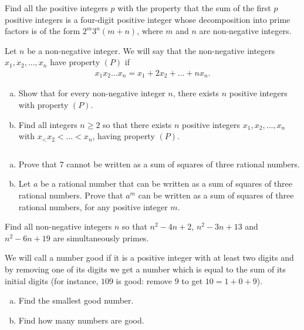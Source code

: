 \documentclass[problems.tex]{subfile}
\begin{document}
	\begin{problem}
		Find all the positive integers $p$ with the property that the sum of the first $p$ positive integers is a four-digit positive integer whose decomposition into prime factors is of the form $2^m3^n(m + n)$, where $m$ and $n$ are non-negative integers.
	\end{problem}



	\begin{problem}
		Let $n$ be a non-negative integer. We will say that the non-negative integers $x_1, x_2, \dots, x_n$ have property $(P)$ if
		\begin{align*}
			x_1x_2 \dots x_n = x_1 + 2x_2  + \dots + nx_n.
		\end{align*}
		\begin{enumerate}[(a)]
			\item  Show that for every non-negative integer $n$, there exists $n$ positive integers with property $(P)$.
			\item Find all integers $n \geq 2$ so that there exists $n$ positive integers $x_1, x_2, \dots, x_n$	with $x_< x_2< \dots< x_n$, having property $(P)$.
		\end{enumerate}
	\end{problem}


	\begin{problem}
		$ $
		\begin{enumerate}[(a)]
			\item Prove that $7$ cannot be written as a sum of squares of three rational numbers.
			\item Let $a$ be a rational number that can be written as a sum of squares of three rational numbers. Prove that $a^m$ can be written as a sum of squares of three rational numbers, for any positive integer $m$.
		\end{enumerate}
	\end{problem}




	\begin{problem}
		Find all non-negative integers $n$ so that $n^2 - 4n + 2$, $n^2 - 3n + 13$ and $n^2 - 6n + 19$ are simultaneously primes.
	\end{problem}


	\begin{problem}
		We will call a number good if it is a positive integer with at least two digits and by removing one of its digits we get a number which is equal to the sum of its initial digits (for instance, $109$ is good: remove $9$ to get $10 = 1 + 0 + 9$).
		\begin{enumerate}[(a)]
			\item Find the smallest good number.
			\item Find how many numbers are good.
		\end{enumerate}
	\end{problem}
\end{document}
